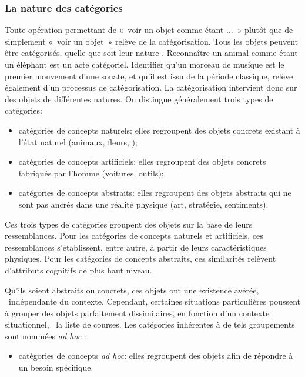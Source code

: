 \subsubsection{La nature des catégories}

Toute opération permettant de «~voir un objet comme étant $\ldots$~» plutôt que de simplement «~voir un objet~» relève de la catégorisation. Tous les objets peuvent être catégorisés, quelle que soit leur nature \citep{goldstone2003concepts}. Reconnaître un animal comme étant un éléphant est un acte catégoriel. Identifier qu'un morceau de musique est le premier mouvement d'une sonate, et qu'il est issu de la période classique, relève également d'un processus de catégorisation. La catégorisation intervient donc sur des objets de différentes natures. On distingue généralement trois types de catégories:

\begin{itemize}
\item catégories de concepts naturels: elles regroupent des objets concrets existant à l'état naturel (animaux, fleurs, \etc);
\item catégories de concepts artificiels: elles regroupent des objets concrets fabriqués par l'homme (voitures, outils);
\item catégories de concepts abstraits: elles regroupent des objets abstraits qui ne sont pas ancrés dans une réalité physique (art, stratégie, sentiments).
\end{itemize}

Ces trois types de catégories groupent des objets sur la base de leurs ressemblances. Pour les catégories de concepts naturels et artificiels, ces ressemblances s'établissent, entre autre, à partir de leurs caractéristiques physiques. Pour les catégories de concepts abstraits, ces similarités relèvent d'attributs cognitifs de plus haut niveau. 

Qu'ils soient abstraits ou concrets, ces objets ont une existence avérée, \ie~indépendante du contexte. Cependant, certaines situations particulières poussent à grouper des objets parfaitement dissimilaires, en fonction d'un contexte situationnel, \eg~la liste de courses. Les catégories inhérentes à de tels groupements sont nommées \emph{ad hoc} \citep{barsalou1983ad}:

\begin{itemize}
 \item catégories de concepts \emph{ad hoc}: elles regroupent des objets afin de répondre à un besoin spécifique.
\end{itemize}

